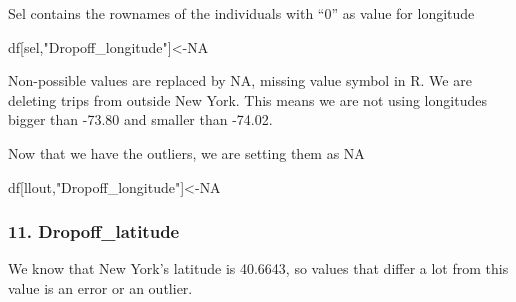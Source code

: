 \documentclass[
  18pt,
  a4paper]{article}
\newenvironment{Shaded}{\begin{snugshade}}{\end{snugshade}}
\newcommand{\CommentTok}[1]{\textcolor[rgb]{0.56,0.35,0.01}{\textit{#1}}}
\newcommand{\DecValTok}[1]{\textcolor[rgb]{0.00,0.00,0.81}{#1}}
\newcommand{\FloatTok}[1]{\textcolor[rgb]{0.00,0.00,0.81}{#1}}
\newcommand{\KeywordTok}[1]{\textcolor[rgb]{0.13,0.29,0.53}{\textbf{#1}}}
\newcommand{\NormalTok}[1]{#1}
\newcommand{\OperatorTok}[1]{\textcolor[rgb]{0.81,0.36,0.00}{\textbf{#1}}}
\newcommand{\OtherTok}[1]{\textcolor[rgb]{0.56,0.35,0.01}{#1}}
\newcommand{\StringTok}[1]{\textcolor[rgb]{0.31,0.60,0.02}{#1}}
\begin{document}
Sel contains the rownames of the individuals with ``0'' as value for
longitude

\begin{Shaded}
\begin{Highlighting}[]
\NormalTok{df[sel,}\StringTok{"Dropoff_longitude"}\NormalTok{]<-}\OtherTok{NA} 
\end{Highlighting}
\end{Shaded}

Non-possible values are replaced by NA, missing value symbol in R. We
are deleting trips from outside New York. This means we are not using
longitudes bigger than -73.80 and smaller than -74.02.

\begin{Shaded}
\end{Shaded}

Now that we have the outliers, we are setting them as NA

\begin{Shaded}
\begin{Highlighting}[]
\NormalTok{df[llout,}\StringTok{"Dropoff_longitude"}\NormalTok{]<-}\OtherTok{NA}
\end{Highlighting}
\end{Shaded}

\hypertarget{dropoff_latitude}{%
\subsubsection{11. Dropoff\_latitude}\label{dropoff_latitude}}

We know that New York's latitude is 40.6643, so values that differ a lot
from this value is an error or an outlier.

\begin{Shaded}
\end{Shaded}
\end{document}
